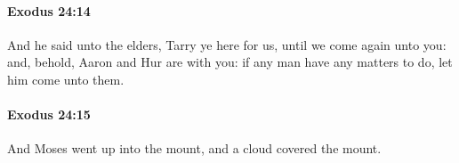 		\paragraph{Exodus 24:14} %
			\label{EXODUS-24-14}

			And he said unto the elders, Tarry ye here for us, until we come again unto you: and, behold, Aaron and Hur are with you: if any man have any matters to do, let him come unto them.


		\paragraph{Exodus 24:15} %
			\label{EXODUS-24-15}

			And Moses went up into the mount, and a cloud covered the mount.


